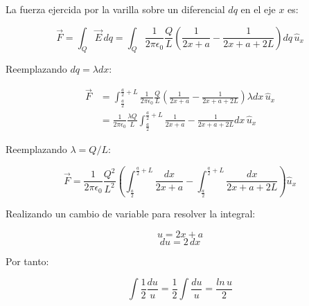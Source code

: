 \documentclass[letter,11pt]{article}
\begin{document}
La fuerza ejercida por la varilla sobre un diferencial $dq$ en el eje $x$ es:

\begin{equation*}
    \vec{F} = \int_Q\vec{E}\,dq
            = \int_Q\frac{1}{2\pi\epsilon_0}\frac{Q}{L}
              \left(\frac{1}{2x+a}-\frac{1}{2x+a+2L}\right)dq\,\hat{u}_x
\end{equation*}
\vspace{0.20cm}

Reemplazando $dq=\lambda dx$:

\begin{equation*}
\begin{split}
    \vec{F} &= \int_{\frac{a}{2}}^{\frac{a}{2}+L}\frac{1}{2\pi\epsilon_0}
               \frac{Q}{L}\left(\frac{1}{2x+a}-\frac{1}{2x+a+2L}\right)
               \lambda dx\,\hat{u}_x\\
            &= \frac{1}{2\pi\epsilon_0}\frac{\lambda Q}{L}
               \int_{\frac{a}{2}}^{\frac{a}{2}+L}
               \frac{1}{2x+a}-\frac{1}{2x+a+2L}dx\,\hat{u}_x
\end{split}
\end{equation*}
\vspace{0.20cm}

Reemplazando $\lambda=Q/L$:

\begin{equation*}
    \vec{F} = \frac{1}{2\pi\epsilon_0}\frac{Q^2}{L^2}
              \left(\int_{\frac{a}{2}}^{\frac{a}{2}+L}\frac{dx}{2x+a}-
              \int_{\frac{a}{2}}^{\frac{a}{2}+L}\frac{dx}{2x+a+2L}\right)
              \hat{u}_x
\end{equation*}
\vspace{0.20cm}

Realizando un cambio de variable para resolver la integral:

\begin{equation*}
    u = 2x+a
\end{equation*}
\begin{equation*}
    du = 2\,dx
\end{equation*}
\vspace{0.20cm}

Por tanto:

\begin{equation*}
    \int\frac{1}{2}\frac{du}{u} = \frac{1}{2}\int\frac{du}{u}
                                = \frac{ln\,u}{2}
\end{equation*}
\vspace{0.20cm}
\end{document}
